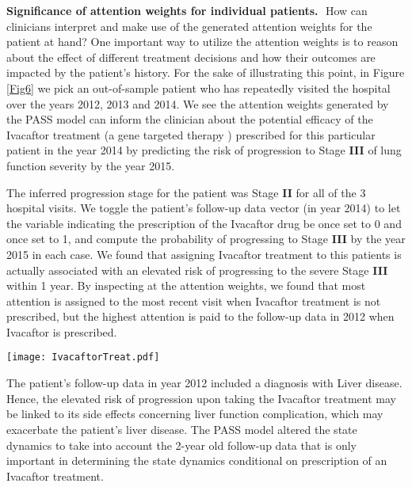 \documentclass[twoside,11pt]{article}
\begin{document}
{\bf Significance of attention weights for individual patients.}\,\, How can clinicians interpret and make use of the generated attention weights for the patient at hand? One important way to utilize the attention weights is to reason about the effect of different treatment decisions and how their outcomes are impacted by the patient's history. For the sake of illustrating this point, in Figure \ref{Fig6} we pick an out-of-sample patient who has repeatedly visited the hospital over the years 2012, 2013 and 2014. We see the attention weights generated by the PASS model can inform the clinician about the potential efficacy of the Ivacaftor treatment (a gene targeted therapy \cite{wainwright2015lumacaftor}) prescribed for this particular patient in the year 2014 by predicting the risk of progression to Stage {\bf III} of lung function severity by the year 2015.  

\begin{minipage}{0.425\textwidth}
The inferred progression stage for the patient was Stage {\bf II} for all of the 3 hospital visits. We toggle the patient's follow-up data vector \mbox{} (in year 2014) to let the variable indicating the prescription of the Ivacaftor drug be once set to 0 and once set to 1, and compute the probability of progressing to Stage {\bf III} by the year 2015 in each case. We found that assigning Ivacaftor treatment to this patients is actually associated with an elevated risk of progressing to the severe Stage {\bf III} within 1 year. By inspecting at the attention weights, we found that most attention is assigned to the most recent visit when Ivacaftor treatment is not prescribed, but the highest attention is paid to the follow-up data in 2012 when Ivacaftor is prescribed.       
\end{minipage}
\hfill
\begin{minipage}[h]{0.55\textwidth}
  \centering
  \texttt{[image: IvacaftorTreat.pdf]}
	\label{Fig6}
\end{minipage} 

The patient's follow-up data in year 2012 included a diagnosis with Liver disease. Hence, the elevated risk of progression upon taking the Ivacaftor treatment may be linked to its side effects concerning liver function complication, which may exacerbate the patient's liver disease. The PASS model altered the state dynamics to take into account the 2-year old follow-up data that is only important in determining the state dynamics conditional on prescription of an Ivacaftor treatment. 
\end{document}
